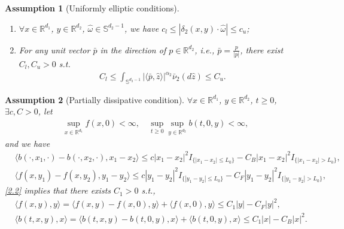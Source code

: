 \documentclass[10pt,a4paper]{amsart}
\newtheorem{assumption}{Assumption}
\newcommand{\R}{\mathbb{R}}
\newcommand{\de}{\delta}
\newcommand{\mb}{\mathbb}
\newcommand{\om}{\omega}
\newcommand{\s}{\mathbb{S}}
\begin{document}
\begin{assumption}[Uniformly elliptic conditions]\label{uni-ell}
	\
\begin{enumerate}
\item  $\forall x\in\R^{d_{1}}$, $ y\in\R^{d_{2}}$, $ \hat{\om}\in\s^{d_{2}-1}$, we have  %
$c_l\le|\de_2(x,y)\cdot \hat{\om}|\le c_u$;

\item  For any unit vector $\bar{p}$ in the direction of $p\in\mathbb{R}^{d_{2}}$, i.e., $\bar{p}=\frac{p}{|p|}$, there exist $C_{l},C_{u}>0$ s.t.
\begin{align*}
	C_{l}\leq\int_{\mathbb{S}^{d_{2}-1}}|\langle\bar{p},\hat{z}\rangle|^{\alpha_{2}}\bar{\nu}_{2}(d\hat{z})\leq C_{u}.
\end{align*}
\end{enumerate}
\end{assumption}

\begin{assumption}[Partially dissipative condition]\label{par-dis}
 $\forall x\in \mathbb{R}^{d_{1}}$, $y\in \mathbb{R}^{d_{2}}$,  $t\geq0$, $\exists c, C>0$,
let 
\begin{align*}
	\sup_{x\in \mathbb{R}^{d_{1}}}f(x,0)<\infty,  \quad \sup_{t\geq0}\sup_{y\in \mathbb{R}^{d_{2}}}b(t,0,y)<\infty, 
\end{align*}
and we have
\begin{equation}\label{2.2}
	\begin{split}
&\langle b(\cdot,x_{1},\cdot)-b(\cdot,x_{2},\cdot), x_{1}-x_{2}\rangle  \leq c|x_{1}-x_{2}|^{2}I_{\{|x_{1}-x_{2}|\leq L_0\}}-C_B|x_{1}-x_{2}|^{2}I_{\{|x_{1}-x_{2}|>L_0\}},\\
	& \langle f(x,y_{1})-f(x,y_{2}), y_{1}-y_{2}\rangle  \leq c|y_{1}-y_{2}|^{2}I_{\{|y_{1}-y_{2}|\leq L_0\}}-C_F|y_{1}-y_{2}|^{2}I_{\{|y_{1}-y_{2}|>L_0\}},	\end{split}
\end{equation}	
\eqref{2.2} implies that there exists $ C_{1}>0$ s.t.,
\begin{equation}\label{2.4}
	\begin{split}
		&\langle f(x,y),y \rangle=\langle f(x,y)-f(x,0), y \rangle +\langle f(x,0),y\rangle   \leq C_{1}|y|-C_F|y|^{2},\\
			&\langle b(t,x,y),x \rangle =\langle  b(t,x,y)-b(t,0,y), x\rangle  + \langle b(t,0,y),x\rangle  \leq C_{1}|x|-C_B|x|^{2}.
	\end{split}
\end{equation}		
\end{assumption}
\end{document}

